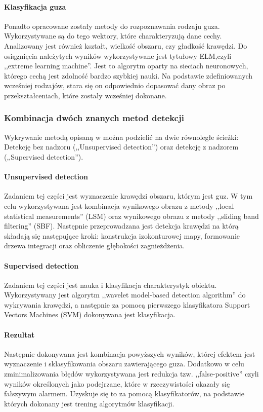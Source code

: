\documentclass[11pt,openany]{sprawozdanie-agh}
\begin{document}
\paragraph{Klasyfikacja guza\\}
Ponadto opracowane zostały metody do rozpoznawania rodzaju guza. Wykorzystywane są do tego wektory, które charakteryzują dane cechy. Analizowany jest również kształt, wielkość obszaru, czy gładkość krawędzi. Do osiągnięcia należytych wyników wykorzystywane jest tytułowy ELM,czyli ,,extreme learning machine''. Jest to algorytm oparty na sieciach neuronowych, którego cechą jest zdolność bardzo szybkiej nauki. Na podstawie zdefiniowanych wcześniej rodzajów, stara się on odpowiednio dopasować dany obraz po przekształceniach, które zostały wcześniej dokonane.

\subsubsection{Kombinacja dwóch znanych metod detekcji}
Wykrywanie metodą opisaną w \cite{Choi2014} można podzielić na dwie równoległe ścieżki: Detekcję bez nadzoru (,,Unsupervised detection'') oraz detekcję z nadzorem (,,Supervised detection'').

\paragraph{Unsupervised detection\\}
Zadaniem tej części jest wyznaczenie krawędzi obszaru, którym jest guz. W tym celu wykorzystywana jest kombinacja wynikowego obrazu z metody ,,local statistical measurements'' (LSM) oraz wynikowego obrazu z metody ,,sliding band filtering'' (SBF). Następnie przeprowadzana jest detekcja krawędzi na którą składają się następujące kroki: konstrukcja izokonturowej mapy, formowanie drzewa integracji oraz obliczenie głębokości zagnieżdżenia. 

\paragraph{Supervised detection\\}
Zadaniem tej części jest nauka i klasyfikacja charakterystyk obiektu. Wykorzystywany jest algorytm ,,wavelet model-based detection algorithm'' do wykrywania krawędzi, a następnie za pomocą pierwszego klasyfikatora Support Vectors Machines (SVM) dokonywana jest klasyfikacja.

\paragraph{Rezultat\\}
Następnie dokonywana jest kombinacja powyższych wyników, której efektem jest wyznaczenie i sklasyfikowania obszaru zawierającego guza.
Dodatkowo w celu zminimalizowania błędów wykorzystywana jest redukcja tzw. ,,false-positive'' czyli wyników określonych jako podejrzane, które w rzeczywistości okazały się fałszywym alarmem. Uzyskuje się to za pomocą klasyfikatorów, na podstawie których dokonany jest trening algorytmów klasyfikacji.
\end{document}
